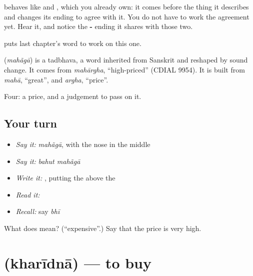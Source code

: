  behaves like \textbf{} and \textbf{}, which you already own: it comes before the thing it describes and changes its ending to agree with it. You do not have to work the agreement yet. Hear it, and notice the \textbf{-} ending it shares with those two.

\textbf{ } puts last chapter's word to work on this one.

\begin{cousinweb}
\textbf{} (\emph{mahãgā}) is a tadbhava, a word inherited from Sanskrit and reshaped by sound change. It comes from \emph{mahārgha}, \textquotedblleft{}high-priced\textquotedblright{} (CDIAL 9954). It is built from \emph{mahā}, \textquotedblleft{}great\textquotedblright{}, and \emph{argha}, \textquotedblleft{}price\textquotedblright{}.
\end{cousinweb}

\begin{grammarlens}[title={What you've built}]
Four: a price, and a judgement to pass on it.
\end{grammarlens}

\subsection*{Your turn}
\begin{itemize}
\raggedright
  \item \emph{Say it:} \emph{mahãgā}, with the nose in the middle
  \item \emph{Say it:} \emph{bahut mahãgā}
  \item \emph{Write it:} , putting the  above the 
  \item \emph{Read it:} \textbf{}
  \item \emph{Recall:} say \emph{bhī}
\end{itemize}

\begin{tcolorbox}[breakable,colback=teal!4,colframe=teal!35!black,title={Before you move on}]
What does  mean? (\textquotedblleft{}expensive\textquotedblright{}.) Say that the price is very high.
\end{tcolorbox}
\section[\texorpdfstring{\hi{ख़रीदना} (kharīdnā)}{ख़रीदना (kharīdnā)}]{ (kharīdnā) — to buy}

